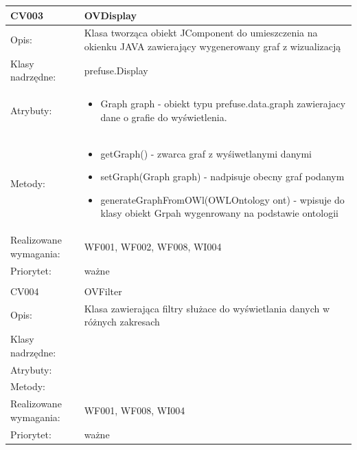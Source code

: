 \begin{center}
\begin{longtable}{|m{3cm}|m{9cm}|}
CV003 & OVDisplay \\ \hline
Opis: &  Klasa tworząca obiekt JComponent do umieszczenia na okienku JAVA zawierający wygenerowany graf z wizualizacją   \\ \hline
Klasy nadrzędne: &  prefuse.Display   \\ \hline
Atrybuty: & \begin{itemize}
 \item Graph graph - obiekt typu prefuse.data.graph zawierajacy dane o grafie do wyświetlenia. 
\end{itemize}
 \\ \hline
Metody: & \begin{itemize}
 \item getGraph() - zwarca graf z wyśiwetlanymi danymi
 \item setGraph(Graph graph) - nadpisuje obecny graf podanym
 \item generateGraphFromOWl(OWLOntology ont) - wpisuje do klasy obiekt Grpah wygenrowany na podstawie ontologii
	 
\end{itemize}
  \\ \hline
Realizowane wymagania: & WF001, WF002, WF008, WI004 \\ \hline
Priorytet: & ważne  \\ \hline

\multicolumn{2}{c}{} \\
 \hline

CV004 & OVFilter \\ \hline
Opis: & Klasa zawierająca filtry służace do wyświetlania danych w różnych zakresach    \\ \hline
Klasy nadrzędne: &     \\ \hline
Atrybuty: & %
 \\ \hline
Metody: & %
  \\ \hline
Realizowane wymagania: & WF001, WF008, WI004 \\ \hline
Priorytet: & ważne  \\ \hline



\end{longtable}

\end{center}

